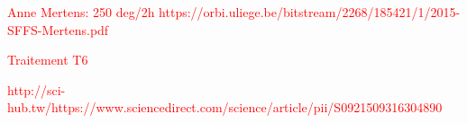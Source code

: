 \textcolor{red}{Anne Mertens: 250 deg/2h
https://orbi.uliege.be/bitstream/2268/185421/1/2015-SFFS-Mertens.pdf}

\textcolor{red}{Traitement T6 \parencite{ABOULKHAIR2016139}}

\textcolor{red}{http://sci-hub.tw/https://www.sciencedirect.com/science/article/pii/S0921509316304890}\\

%
%
